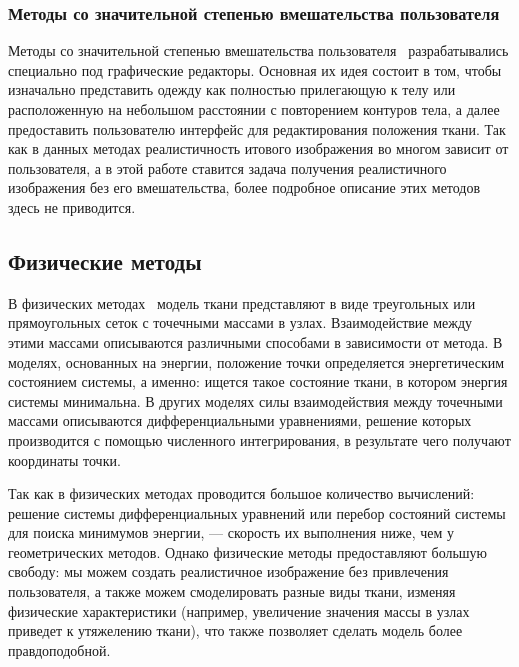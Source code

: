 
\subsubsection{Методы со значительной степенью вмешательства пользователя}

Методы со значительной степенью вмешательства пользователя~\cite{bib09, bib10}
разрабатывались специально под графические редакторы. Основная их идея состоит в
том, чтобы изначально представить одежду как полностью прилегающую к телу или
расположенную на небольшом расстоянии с повторением контуров тела, а далее
предоставить пользователю интерфейс для редактирования положения ткани.  Так как
в данных методах реалистичность итового изображения во многом зависит от
пользователя, а в этой работе ставится задача получения реалистичного
изображения без его вмешательства, более подробное описание этих методов здесь
не приводится.

\subsection{Физические методы}

В физических методах~\cite{bib07} модель ткани представляют в виде треугольных
или прямоугольных сеток с точечными массами в узлах. Взаимодействие между этими
массами  описываются различными способами в зависимости от метода. В моделях,
основанных на энергии, положение точки определяется энергетическим состоянием
системы, а именно: ищется такое состояние ткани, в котором энергия системы
минимальна. В других моделях силы взаимодействия между точечными массами
описываются дифференциальными уравнениями, решение которых производится с
помощью численного интегрирования, в результате чего получают координаты точки.

Так как в физических методах проводится большое количество вычислений: решение
системы дифференциальных уравнений или перебор состояний системы для поиска
минимумов энергии, --- скорость их выполнения ниже, чем у геометрических
методов. Однако физические методы предоставляют большую свободу: мы можем
создать реалистичное изображение без привлечения пользователя, а также можем
смоделировать разные виды ткани, изменяя физические характеристики (например,
увеличение значения массы в узлах приведет к утяжелению ткани), что также
позволяет сделать модель более правдоподобной.

